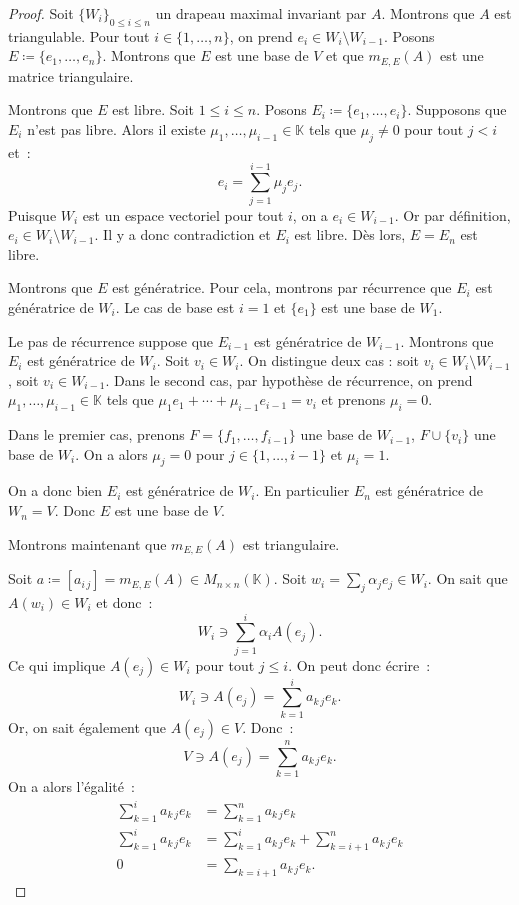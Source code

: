 \documentclass{article}
\newcommand{\K}{\mathbb K}
\newcommand{\M}[3]{M_{#1 \times #2}(#3)}
\theoremstyle{definition}
\theoremstyle{remark}
\begin{document}
		\begin{proof} Soit $\{W_i\}_{0 \leq i \leq n}$ un drapeau maximal invariant par $A$. Montrons que $A$ est triangulable. Pour tout $i \in \{1, \dotsc, n\}$,
		on prend $e_i \in W_i \setminus W_{i-1}$. Posons $E \coloneqq \{e_1, \dotsc, e_n\}$. Montrons que $E$ est une base de $V$ et que $m_{E, E}(A)$ est une
		matrice triangulaire.

		Montrons que $E$ est libre. Soit $1 \leq i \leq n$. Posons $E_i \coloneqq \{e_1, \dotsc, e_i\}$. Supposons que $E_i$ n'est pas libre. Alors il
		existe $\mu_1, \dots, \mu_{i-1} \in \K$ tels que $\mu_j \neq 0$ pour tout $j < i$ et~:
		\[e_i = \sum_{j=1}^{i-1}\mu_je_j.\]
		Puisque $W_i$ est un espace vectoriel pour tout $i$, on a $e_i \in W_{i-1}$. Or par définition, $e_i \in W_i \setminus W_{i-1}$. Il y a donc contradiction
		et $E_i$ est libre. Dès lors, $E = E_n$ est libre.

		Montrons que $E$ est génératrice. Pour cela, montrons par récurrence que $E_i$ est génératrice de $W_i$. Le cas de base est $i=1$ et $\{e_1\}$ est
		une base de $W_1$.

		Le pas de récurrence suppose que $E_{i-1}$ est génératrice de $W_{i-1}$. Montrons que $E_i$ est génératrice de $W_i$. Soit $v_i \in W_i$. On
		distingue deux cas : soit $v_i \in W_i \setminus W_{i-1}$, soit $v_i \in W_{i-1}$. Dans le second cas, par hypothèse de récurrence, on prend
		$\mu_1, \dotsc, \mu_{i-1} \in \K$ tels que $\mu_1e_1 + \dotsb + \mu_{i-1}e_{i-1} = v_i$ et prenons $\mu_i = 0$.

		Dans le premier cas, prenons $F = \{f_1, \dotsc, f_{i-1}\}$ une base de $W_{i-1}$, $F \cup \{v_i\}$ une base de $W_i$. On a alors $\mu_j = 0$
		pour $j \in \{1, \dotsc, i-1\}$ et $\mu_i = 1$.

		On a donc bien $E_i$ est génératrice de $W_i$. En particulier $E_n$ est génératrice de $W_n = V$. Donc $E$ est une base de $V$.

		Montrons maintenant que $m_{E, E}(A)$ est triangulaire.

		Soit $a \coloneqq [a_{i\,j}] = m_{E, E}(A) \in \M nn\K$. Soit $w_i = \sum_j\alpha_je_j \in W_i$. On sait que $A(w_i) \in W_i$ et donc~:
		\[W_i \ni \sum_{j=1}^i\alpha_iA(e_j).\]
		Ce qui implique $A(e_j) \in W_i$ pour tout $j \leq i$. On peut donc écrire~:
		\[W_i \ni A(e_j) = \sum_{k=1}^ia_{k\,j}e_k.\]
		Or, on sait également que $A(e_j) \in V$. Donc~:
		\[V \ni A(e_j) = \sum_{k=1}^na_{k\,j}e_k.\]
		On a alors l'égalité~:
		\[\begin{aligned}
			\sum_{k=1}^ia_{k\,j}e_k &= \sum_{k=1}^na_{k\,j}e_k \\
			\sum_{k=1}^ia_{k\,j}e_k &= \sum_{k=1}^ia_{k\,j}e_k + \sum_{k=i+1}^na_{k\,j}e_k \\
			0 &= \sum_{k=i+1}a_{k\,j}e_k.
		\end{aligned}\]


\end{proof}
\end{document}
